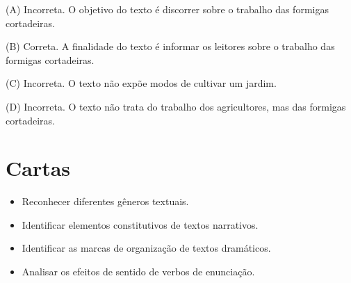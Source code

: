 (A) Incorreta. O objetivo do texto é discorrer sobre o trabalho das
formigas cortadeiras.

(B) Correta. A finalidade do texto é informar os leitores sobre o
trabalho das formigas cortadeiras.

(C) Incorreta. O texto não expõe modos de cultivar um jardim.

(D) Incorreta. O texto não trata do trabalho dos agricultores, mas das
formigas cortadeiras.

\chapter{Cartas}



\begin{itemize}
\item Reconhecer diferentes gêneros textuais.

\item Identificar elementos constitutivos de textos narrativos.

\item Identificar as marcas de organização de textos dramáticos.

\item Analisar os efeitos de sentido de verbos de enunciação.
\end{itemize}


